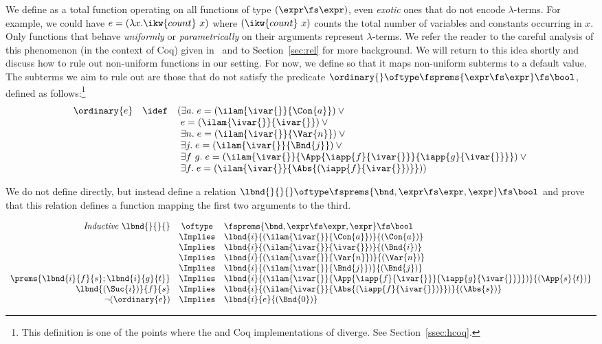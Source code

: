 \documentclass[final]{svjour3}
\begin{document}
We define  as a total function operating on all functions
of type $(\expr \fs \expr)$, even \emph{exotic} ones
that do not encode $\lambda$-terms.  For example, we could have $e =
(\lambda x.\ikw{count}~x)$ where $(\ikw{count}~x)$ counts the total
number of variables and constants occurring in $x$.  Only functions
that behave \emph{uniformly} or \emph{parametrically} on their
arguments represent $\lambda$-terms.  We refer the reader to the
careful analysis of this phenomenon (in the context of Coq) given
in~\cite{DFHtlca95} and to Section~\ref{sec:rel} for more background.
We will return to this idea shortly and discuss how to rule out
non-uniform functions in our setting.  For now, we define 
so that it maps non-uniform subterms to a default value.  The subterms
we aim to rule out are those that do not satisfy the predicate
$\ordinary{} \oftype \fsprems{\expr\fs\expr} \fs \bool$, defined as
follows:\footnote{This definition is one of the points where the \HOL
  and Coq implementations of \hybrid diverge.  See
  Section~\ref{ssec:hcoq}.  }
 \[
 \begin{array}{rcl}
   \ordinary{e} & \idef
    & (\exists a.\;e=(\ilam{\ivar{}}{\Con{a}})\lor{} \\
   &&~e=(\ilam{\ivar{}}{\ivar{}})\lor{} \\
   &&~\exists n.\;e=(\ilam{\ivar{}}{\Var{n}})\lor{} \\
   &&~\exists j.\;e=(\ilam{\ivar{}}{\Bnd{j}})\lor{} \\
   &&~\exists f\ g.\;e=
        (\ilam{\ivar{}}{\App{\iapp{f}{\ivar{}}}{\iapp{g}{\ivar{}}}})\lor{} \\
   &&~\exists f.\;e=(\ilam{\ivar{}}{\Abs{(\iapp{f}{\ivar{}})}}))  \end{array}
 \]
\begin{sloppypar}
We do not define  directly, but instead define a relation
\mbox{$\lbnd{}{}{} \oftype \fsprems{\bnd,\expr\fs\expr,\expr} \fs \bool$} and
prove that this relation defines a function mapping the first two
arguments to the third.
\end{sloppypar}
\[
\begin{array}{rcl}
 \mathit{Inductive}\ \lbnd{}{}{} &\oftype& \fsprems{\bnd,\expr\fs\expr,\expr}
  \fs \bool\\ 
& \Implies &  \lbnd{i}{(\ilam{\ivar{\null}}{\Con{a}})}{(\Con{a})} \\
 & \Implies & \lbnd{i}{(\ilam{\ivar{\null}}{\ivar{\null}})}{(\Bnd{i})} \\
 & \Implies & \lbnd{i}{(\ilam{\ivar{\null}}{\Var{n}})}{(\Var{n})} \\
 & \Implies & \lbnd{i}{(\ilam{\ivar{\null}}{\Bnd{j}})}{(\Bnd{j})} \\
 \prems{\lbnd{i}{f}{s}; \lbnd{i}{g}{t}}
 & \Implies & 
 \lbnd{i}{(
 \ilam{\ivar{\null}}{\App{\iapp{f}{\ivar{\null}}}{\iapp{g}{\ivar{\null}}}}
 )}{(
 \App{s}{t}
 )}  \\
 \lbnd{(\Suc{i})}{f}{s}
 & \Implies & 
 \lbnd{i}{(\ilam{\ivar{\null}}{\Abs{(\iapp{f}{\ivar{\null}})}})}{(\Abs{s})}
\\  
\lnot (\ordinary{e})
 & \Implies & 
\lbnd{i}{e}{(\Bnd{0})} 
\end{array}
\]
\end{document}
